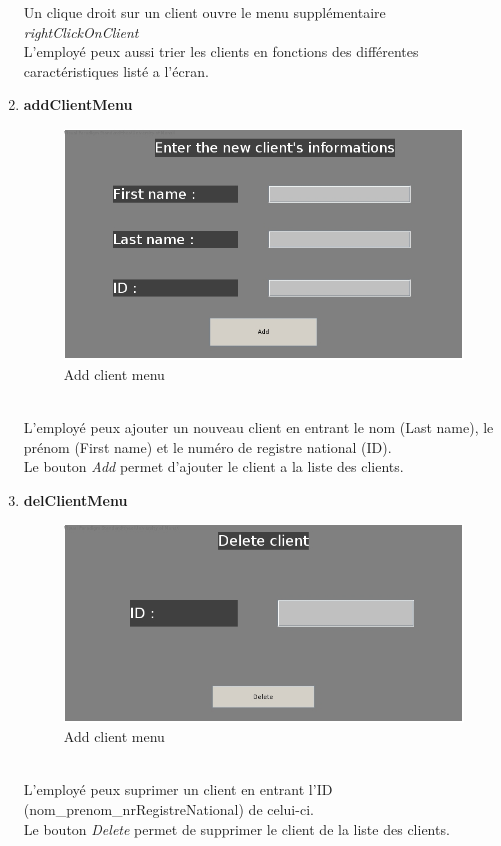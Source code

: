 \documentclass[../rapport.tex]{subfiles}
\begin{document}
\begin{enumerate}
Un clique droit sur un client ouvre le menu supplémentaire \textit{rightClickOnClient}\\
L'employé peux aussi trier les clients en fonctions des différentes caractéristiques listé a l'écran.\\
\newpage
\item \textbf{addClientMenu} \\
		\begin{figure}[h!]
				\centering \includegraphics[scale=0.2]{ressources/photos_diagrammes/app2/gui/addClientMenu.jpg}
				\caption{Add client menu}
		\end{figure}
		\\
L'employé peux ajouter un nouveau client en entrant le nom (Last name), le prénom (First name) et le numéro de registre national (ID).\\
Le bouton \textit{Add} permet d'ajouter le client a la liste des clients.\\
\newpage
\item \textbf{delClientMenu} \\
		\begin{figure}[h!]
				\centering \includegraphics[scale=0.2]{ressources/photos_diagrammes/app2/gui/deleteClientMenu.jpg}
				\caption{Add client menu}
		\end{figure}
		\\
L'employé peux suprimer un client en entrant l'ID (nom\_prenom\_nrRegistreNational) de celui-ci.\\
Le bouton \textit{Delete} permet de supprimer le client de la liste des clients.\\


\end{enumerate}
\end{document}
